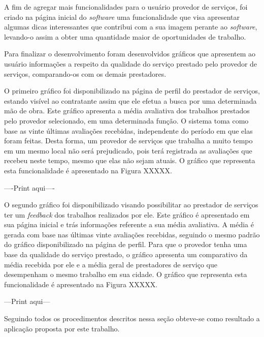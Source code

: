 \par A fim de agregar mais funcionalidades para o usuário provedor de serviços, foi criado na página inicial do \textit{software} uma funcionalidade que visa apresentar algumas dicas interessantes que contribui com a sua imagem perante ao \textit{software}, levando-o assim a obter uma quantidade maior de oportunidades de trabalho.

\par Para finalizar o desenvolvimento foram desenvolvidos gráficos que apresentem ao usuário informações a respeito da qualidade do serviço prestado pelo provedor de serviços, comparando-os com os demais prestadores.

\par O primeiro gráfico foi disponibilizado na página de perfil do prestador de serviços, estando visível ao contratante assim que ele efetua a busca por uma determinada mão de obra. Este gráfico apresenta a média avaliativa dos trabalhos prestados pelo provedor selecionado, em uma determinada função. O sistema toma como base as vinte últimas avaliações recebidas, independente do período em que elas foram feitas. Desta forma, um provedor de serviços que trabalha a muito tempo em um mesmo local não será prejudicado, pois terá registrada as avaliações que recebeu neste tempo, mesmo que elas não sejam atuais. O gráfico que representa esta funcionalidade é apresentado na Figura XXXXX.

----Print aqui----


\par O segundo gráfico foi disponibilizado visando possibilitar ao prestador de serviços ter um \textit{feedback} dos trabalhos realizados por ele. Este gráfico é apresentado em sua página inicial e trás informações referente a sua média avaliativa. A média é gerada com base nas últimas vinte avaliações recebidas, seguindo o mesmo padrão do gráfico disponibilizado na página de perfil. Para que o provedor tenha uma base da qualidade do serviço prestado, o gráfico apresenta um comparativo da média recebida por ele e a média geral de prestadores de serviço que desempenham o mesmo trabalho em sua cidade. O gráfico que representa esta funcionalidade é apresentado na Figura XXXXX.


---Print aqui---



\par Seguindo todos os procedimentos descritos nessa seção obteve-se como resultado a aplicação proposta por este trabalho.